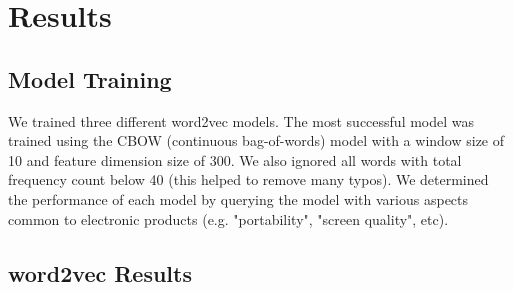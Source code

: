 \documentclass{article} %
\begin{document}
\section{Results}

\subsection{Model Training} We trained three different word2vec models. The most successful model was trained using the CBOW (continuous bag-of-words) model with a window size of 10 and feature dimension size of 300. We also ignored all words with total frequency count below 40 (this helped to remove many typos). We determined the performance of each model by querying the model with various aspects common to electronic products (e.g. "portability", "screen quality", etc).

\subsection{word2vec Results}


%
%
\end{document}
